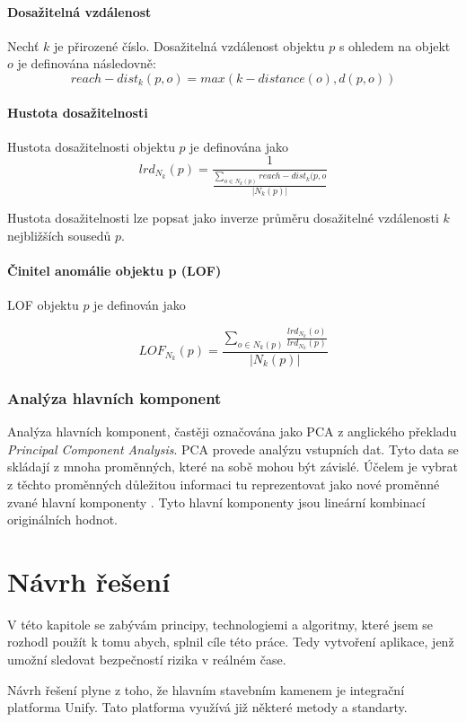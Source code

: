\documentclass[thesis=M,czech]{FITthesis}[2012/10/20]
\begin{document}
			\subsubsection{Dosažitelná vzdálenost}
				Nechť $k$ je přirozené číslo. Dosažitelná vzdálenost objektu $p$ s ohledem na objekt $o$ je definována následovně: 
				$$ reach-dist_k(p, o) = max (k-distance(o), d(p, o)) $$
				
			\subsubsection{Hustota dosažitelnosti}
				Hustota dosažitelnosti objektu $p$ je definována jako
				$$ lrd_{N_k}(p) = \frac{1}{ \frac{\sum_{o \in N_k(p)} reach-dist_k(p,o}{|N_k(p)|}} $$
				
				Hustota dosažitelnosti lze popsat jako inverze průměru dosažitelné vzdálenosti $k$ nejbližších sousedů $p$.
				
			\subsubsection{Činitel anomálie objektu p (LOF)}
				LOF objektu $p$ je definován jako 
				
				$$LOF_{N_k}(p) = \frac{\sum_{o \in N_k(p)} \frac{lrd_{N_k}(o)}{lrd_{N_k}(p)}}{|N_k(p)|} $$		
		
		\subsection{Analýza hlavních komponent}
		\label{sec:pca}
		Analýza hlavních komponent, častěji označována jako PCA z anglického překladu \textit{Principal Component Analysis}. PCA provede analýzu vstupních dat. Tyto data se skládají z mnoha proměnných, které na sobě mohou být závislé. Účelem je vybrat z těchto proměnných důležitou informaci tu reprezentovat jako nové proměnné zvané hlavní komponenty \cite{PCA_book}. Tyto hlavní komponenty jsou lineární kombinací originálních hodnot.
		
	

\chapter{Návrh řešení}
	V této kapitole se zabývám principy, technologiemi a algoritmy, které jsem se rozhodl použít k tomu abych, splnil cíle této práce. Tedy vytvoření aplikace, jenž umožní sledovat bezpečností rizika v reálném čase.
	
	Návrh řešení plyne z toho, že hlavním stavebním kamenem je integrační platforma Unify. Tato platforma využívá již některé metody a standarty. 
	
\end{document}
